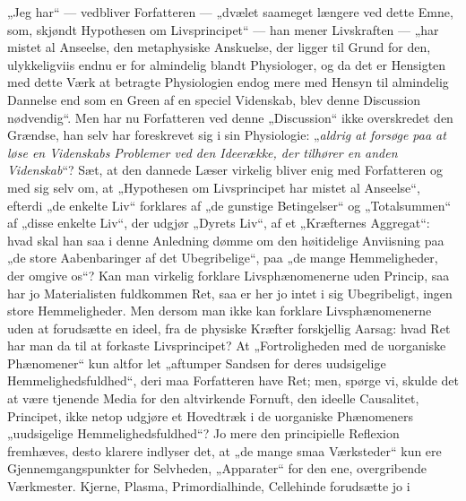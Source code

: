 \documentclass[12pt,a4paper]{book}
\begin{document}
{„Jeg har“ --- vedbliver Forfatteren --- „dvælet saameget længere ved
dette Emne, som, skjøndt Hypothesen om Livsprincipet“ --- han mener
Livskraften --- „har mistet al Anseelse, den metaphysiske Anskuelse, der
ligger til Grund for den, ulykkeligviis endnu er for almindelig blandt
Physiologer, og da det er Hensigten med dette Værk at betragte
Physiologien endog mere med Hensyn til almindelig Dannelse end som en
Green af en speciel Videnskab, blev denne Discussion nødvendig“.
Men har nu Forfatteren ved denne „Discussion“ ikke overskredet den
Grændse, han selv har foreskrevet sig i sin Physiologie: „\emph{aldrig at
forsøge paa at løse en Videnskabs Problemer ved den Ideerække, der
tilhører en anden Videnskab}“? Sæt, at
den dannede Læser virkelig bliver enig med Forfatteren og med sig selv
om, at „Hypothesen om Livsprincipet har mistet al Anseelse“, efterdi „de
enkelte Liv“ forklares af „de gunstige Betingelser“ og „Totalsummen“ af
„disse enkelte Liv“, der udgjør „Dyrets Liv“, af et „Kræfternes
Aggregat“: hvad skal han saa i denne Anledning dømme om den høitidelige
Anviisning paa „de store Aabenbaringer af det Ubegribelige“, paa „de
mange Hemmeligheder, der omgive os“? Kan man virkelig forklare
Livsphænomenerne uden Princip, saa har jo Materialisten fuldkommen Ret,
saa er her jo intet i sig Ubegribeligt, ingen store Hemmeligheder. Men
dersom man ikke kan forklare Livsphænomenerne uden at forudsætte en
ideel, fra de physiske Kræfter forskjellig Aarsag: hvad Ret har man da
til at forkaste Livsprincipet? At „Fortroligheden med de uorganiske
Phænomener“ kun altfor let „aftumper Sandsen for deres uudsigelige
Hemmelighedsfuldhed“, deri maa Forfatteren have Ret; men, spørge vi,
skulde det at være tjenende Media for den altvirkende Fornuft, den
ideelle Causalitet, Principet, ikke netop udgjøre et Hovedtræk i de
uorganiske Phænomeners „uudsigelige Hemmelighedsfuldhed“?}
Jo mere den principielle Reflexion fremhæves, desto klarere indlyser
det, at „de mange smaa Værksteder“ kun ere
Gjennemgangspunkter for Selvheden, „Apparater“ for den ene, overgribende
Værkmester. Kjerne, Plasma, Primordialhinde, Cellehinde forudsætte jo i
\end{document}
